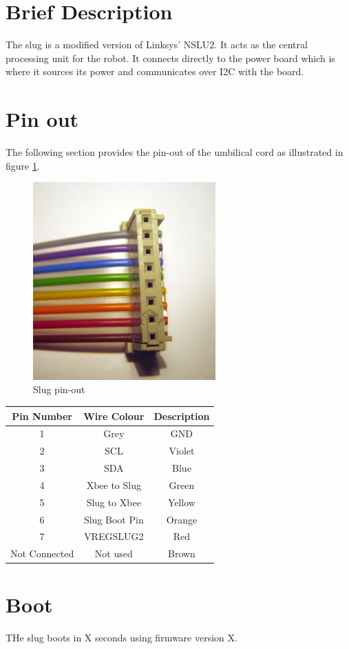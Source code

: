 \documentclass[a4paper, 12pt]{article}
\begin{document}
\section{Brief Description}

The slug is a modified version of Linksys' NSLU2. It acts as the central processing unit for the robot. It connects directly to the power board which is where it sources its power and communicates over I2C with the board.

\clearpage
\newpage

\section {Pin out}

The following section provides the pin-out of the umbilical cord as illustrated in figure \ref{slug-pinout}.

\begin{figure}[ht]
\begin{center}
\includegraphics[keepaspectratio, width=7cm]{./images/slugpins.png}
\caption {\label{slug-pinout}Slug pin-out}
\end{center}
\end{figure}

\begin{center}
\begin{tabular}{|c|c|c|}
\hline
\textbf {Pin Number} & \textbf {Wire Colour} & \textbf {Description}\\
\hline
1 & Grey & GND\\
2 & SCL & Violet\\
3 & SDA & Blue\\
4 & Xbee to Slug & Green\\
5 & Slug to Xbee & Yellow\\
6 & Slug Boot Pin & Orange\\
7 & VREGSLUG2 & Red\\
Not Connected & Not used & Brown\\
\hline
\end{tabular}
\end{center}

\section {Boot}

THe slug boots in X seconds using firmware version X.
\end{document}
